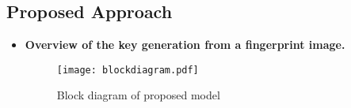 


\subsection{Proposed Approach}
\begin{frame}[t]{\subsecname}
	\topline
    \begin{itemize}
    	\item \textcolor{navy_theme}{\textbf{Overview of the key generation from a fingerprint image.}}
    	\vspace{1em}
		\begin{figure}[!ht]
				\centering
				\texttt{[image: blockdiagram.pdf]}
				\caption{Block diagram of proposed model}
				\label{fig:blockdiagram}
				\vspace{-6mm}
			\end{figure}
		
		\end{itemize}
\end{frame}

